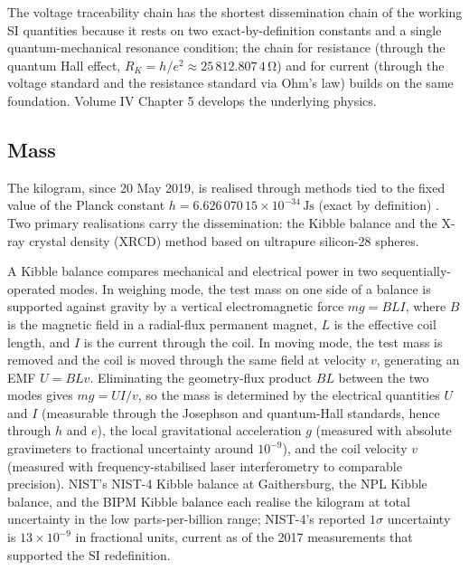 The voltage traceability chain has the shortest dissemination
chain of the working SI quantities because it rests on two
exact-by-definition constants and a single quantum-mechanical
resonance condition; the chain for resistance (through the quantum
Hall effect, $R_{K} = h/e^{2} \approx 25\,812.807\,4 \,\si{\ohm}$)
and for current (through the voltage standard and the resistance
standard via Ohm's law) builds on the same foundation. Volume IV
Chapter 5 develops the underlying physics.

\subsection{Mass}

The kilogram, since 20 May 2019, is realised through methods tied
to the fixed value of the Planck constant
$h = 6.626\,070\,15 \times 10^{-34}\,\si{\joule\second}$
(exact by definition) \cite{std:bipm-si2019,web:nist-kibble-balance}.
Two primary realisations carry the dissemination: the Kibble
balance and the X-ray crystal density (XRCD) method based on
ultrapure silicon-28 spheres.

A Kibble balance compares mechanical and electrical power in two
sequentially-operated modes. In weighing mode, the test mass on
one side of a balance is supported against gravity by a vertical
electromagnetic force $mg = BLI$, where $B$ is the magnetic field
in a radial-flux permanent magnet, $L$ is the effective coil
length, and $I$ is the current through the coil. In moving mode,
the test mass is removed and the coil is moved through the same
field at velocity $v$, generating an EMF $U = BLv$. Eliminating
the geometry-flux product $BL$ between the two modes gives
$mg = UI/v$, so the mass is determined by the electrical
quantities $U$ and $I$ (measurable through the Josephson and
quantum-Hall standards, hence through $h$ and $e$), the local
gravitational acceleration $g$ (measured with absolute gravimeters
to fractional uncertainty around $10^{-9}$), and the coil
velocity $v$ (measured with frequency-stabilised laser
interferometry to comparable precision). NIST's NIST-4 Kibble
balance at Gaithersburg, the NPL Kibble balance, and the BIPM
Kibble balance each realise the kilogram at total uncertainty in
the low parts-per-billion range; NIST-4's reported $1\sigma$
uncertainty is $13 \times 10^{-9}$ in fractional units, current
as of the 2017 measurements that supported the SI redefinition.

